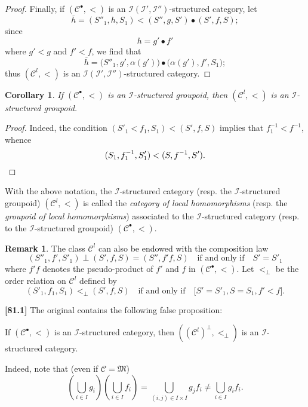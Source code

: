 \documentclass[a4paper,fleqn]{article}
\theoremstyle{plain}
\newenvironment{proposition}[1]
  {\renewcommand\theinnerproposition{#1}\innerproposition}
  {\endinnerproposition}
\newtheorem*{corollary*}{Corollary}
\theoremstyle{definition}
\newenvironment{definition}[1]
  {\renewcommand\theinnerdefinition{#1}\innerdefinition}
  {\endinnerdefinition}
\newtheorem*{remark}{Remark}
\newenvironment{longcomm}[1]
  {\noindent\textbf{[#1]}\rmfamily}
  {}
\newcommand{\oldpage}[1]{{\marginpar{\footnotesize$\bigg\vert$\,\,\,\,\textit{p.~#1}}}}
\newcommand{\CC}{\mathcal{C}}
\newcommand{\MM}{\mathfrak{M}}
\newcommand{\II}{\mathcal{I}}
\begin{document}
\begin{proof}
  Finally, if $(\CC^\bullet,<)$ is an $\II(\II',\II'')$-structured category, let
  \[
    \overline{h}
    = (S''_1,h,S_1)
    < (S'',g,S')\bullet(S',f,S);
  \]
  since
  \[
    h = g'\bullet f'
  \]
  where $g'<g$ and $f'<f$, we find that
  \[
    \overline{h}
    = \big(S''_1,g',\alpha(g')\big)\bullet\big(\alpha(g'),f',S_1\big);
  \]
  thus $(\CC^l,<)$ is an $\II(\II',\II'')$-structured category.
\end{proof}

\begin{corollary*}
  If $(\CC^\bullet,<)$ is an $\II$-structured groupoid, then $(\CC^l,<)$ is an $\II$-structured groupoid.
\end{corollary*}

\begin{proof}
  \oldpage{409}
  Indeed, the condition $(S'_1<f_1,S_1)<(S',f,S)$ implies that $f_1^{-1}<f^{-1}$, whence
  \[
    (S_1,f_1^{-1},S'_1)
    < (S,f^{-1},S').
    \qedhere
  \]
\end{proof}

\begin{definition}{22}
\label{definition:ii-22}
  With the above notation, the $\II$-structured category (resp. the $\II$-structured groupoid) $(\CC^l,<)$ is called the \emph{category of local homomorphisms} (resp. the \emph{groupoid of local homomorphisms}) associated to the $\II$-structured category (resp. to the $\II$-structured groupoid) $(\CC^\bullet,<)$.
\end{definition}

\begin{remark}
  The class $\CC^l$ can also be endowed with the composition law
  \[
    (S''_1,f',S'_1)\perp(S',f,S)
    = (S'',f'f,S)
    \quad\text{if and only if}\quad
    S'=S'_1
  \]
  where $f'f$ denotes the pseudo-product of $f'$ and $f$ in $(\CC^\bullet,<)$.
  Let $<_\perp$ be the order relation on $\CC^l$ defined by
  \[
    (S'_1,f_1,S_1)
    <_\perp (S',f,S)
    \quad\text{if and only if}\quad
    \big[
      S'=S'_1,
      S=S_1,
      f'<f
    \big].
  \]
\end{remark}

\begin{longcomm}{81.1}
  The original contains the following false proposition:

  \begin{proposition}{26~bis}
    If $(\CC^\bullet,<)$ is an $\II$-structured category, then $((\CC^l)^\perp,<_\perp)$ is an $\II$-structured category.
  \end{proposition}

  Indeed, note that (even if $\CC=\MM$)
  \[
    \left(\bigcup_{i\in I}g_i\right)\left(\bigcup_{i\in I}f_i\right)
    = \bigcup_{(i,j)\in I\times I}g_jf_i
    \neq \bigcup_{i\in I}g_if_i.
  \]
\end{longcomm}
\end{document}
